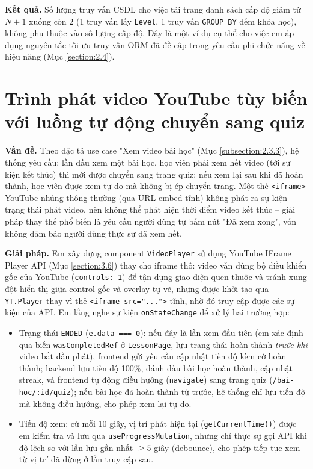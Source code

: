 \documentclass[../DoAn.tex]{subfiles}
\begin{document}
\textbf{Kết quả.} Số lượng truy vấn CSDL cho việc tải trang danh sách cấp độ giảm từ \(N+1\) xuống còn \(2\) (1 truy vấn lấy \texttt{Level}, 1 truy vấn \texttt{GROUP BY} đếm khóa học), không phụ thuộc vào số lượng cấp độ. Đây là một ví dụ cụ thể cho việc em áp dụng nguyên tắc tối ưu truy vấn ORM đã đề cập trong yêu cầu phi chức năng về hiệu năng (Mục \ref{section:2.4}).

\section{Trình phát video YouTube tùy biến với luồng tự động chuyển sang quiz}
\label{section:5.5}

\textbf{Vấn đề.} Theo đặc tả use case "Xem video bài học" (Mục \ref{subsection:2.3.3}), hệ thống yêu cầu: lần đầu xem một bài học, học viên phải xem hết video (tới sự kiện kết thúc) thì mới được chuyển sang trang quiz; nếu xem lại sau khi đã hoàn thành, học viên được xem tự do mà không bị ép chuyển trang. Một thẻ \texttt{<iframe>} YouTube nhúng thông thường (qua URL embed tĩnh) không phát ra sự kiện trạng thái phát video, nên không thể phát hiện thời điểm video kết thúc -- giải pháp thay thế phổ biến là yêu cầu người dùng tự bấm nút "Đã xem xong", vốn không đảm bảo người dùng thực sự đã xem hết.

\textbf{Giải pháp.} Em xây dựng component \texttt{VideoPlayer} sử dụng YouTube IFrame Player API (Mục \ref{section:3.6}) thay cho iframe thô: video vẫn dùng bộ điều khiển gốc của YouTube (\texttt{controls: 1}) để tận dụng giao diện quen thuộc và tránh xung đột hiển thị giữa control gốc và overlay tự vẽ, nhưng được khởi tạo qua \texttt{YT.Player} thay vì thẻ \texttt{<iframe src="...">} tĩnh, nhờ đó truy cập được các sự kiện của API. Em lắng nghe sự kiện \texttt{onStateChange} để xử lý hai trường hợp:

\begin{itemize}
    \item Trạng thái \texttt{ENDED} (\texttt{e.data === 0}): nếu đây là lần xem đầu tiên (em xác định qua biến \texttt{wasCompletedRef} ở \texttt{LessonPage}, lưu trạng thái hoàn thành \textit{trước khi} video bắt đầu phát), frontend gửi yêu cầu cập nhật tiến độ kèm cờ hoàn thành; backend lưu tiến độ 100\%, đánh dấu bài học hoàn thành, cập nhật streak, và frontend tự động điều hướng (\texttt{navigate}) sang trang quiz (\texttt{/bai-hoc/:id/quiz}); nếu bài học đã hoàn thành từ trước, hệ thống chỉ lưu tiến độ mà không điều hướng, cho phép xem lại tự do.
    \item Tiến độ xem: cứ mỗi 10 giây, vị trí phát hiện tại (\texttt{getCurrentTime()}) được em kiểm tra và lưu qua \texttt{useProgressMutation}, nhưng chỉ thực sự gọi API khi độ lệch so với lần lưu gần nhất \(\geq 5\) giây (debounce), cho phép tiếp tục xem từ vị trí đã dừng ở lần truy cập sau.
\end{itemize}
\end{document}
